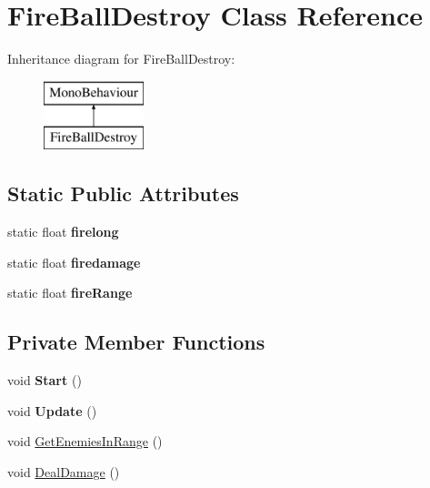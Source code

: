 \hypertarget{class_fire_ball_destroy}{}\section{Fire\+Ball\+Destroy Class Reference}
\label{class_fire_ball_destroy}
Inheritance diagram for Fire\+Ball\+Destroy\+:\begin{figure}[H]
\begin{center}
\leavevmode
\includegraphics[height=2.000000cm]{class_fire_ball_destroy}
\end{center}
\end{figure}
\subsection*{Static Public Attributes}
\begin{DoxyCompactItemize}
\item 
\mbox{\label{class_fire_ball_destroy_aa26d2486387b7c447dcb99d965f6ffb4}} 
static float {\bfseries firelong}
\item 
\mbox{\label{class_fire_ball_destroy_a56d137d97d69e4b4e52f1a882639750a}} 
static float {\bfseries firedamage}
\item 
\mbox{\label{class_fire_ball_destroy_a3e0d99f013c8f03d2e6eb125379dfe21}} 
static float {\bfseries fire\+Range}
\end{DoxyCompactItemize}
\subsection*{Private Member Functions}
\begin{DoxyCompactItemize}
\item 
\mbox{\label{class_fire_ball_destroy_a9a23ef14801277bc2e8d0c04ae28a8e9}} 
void {\bfseries Start} ()
\item 
\mbox{\label{class_fire_ball_destroy_ac0d6946ea2ee72f67f4ad59adc1646f0}} 
void {\bfseries Update} ()
\item 
void \hyperlink{class_fire_ball_destroy_a104f0b956151d400f8412b9c7cbacf19}{Get\+Enemies\+In\+Range} ()
\item 
void \hyperlink{class_fire_ball_destroy_aebef1bc70ef5485396a840c7c38dfea5}{Deal\+Damage} ()
\end{DoxyCompactItemize}
